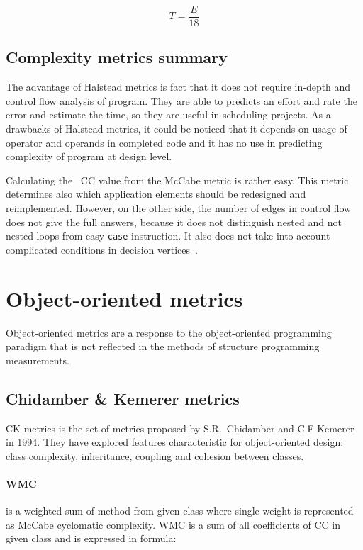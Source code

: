 \begin{equation}
T=\frac { E }{ 18 } 
\end{equation}

\subsection{Complexity metrics summary}
The advantage of Halstead metrics is fact that it does not require in-depth and control flow analysis of program. They are able to predicts an effort and rate the error and estimate the time, so they are useful in scheduling projects. As a drawbacks of Halstead metrics, it could be noticed that it depends on usage of operator and operands in completed code and it has no use in predicting complexity of program at design level.

Calculating the ~\ac{CC} value from the McCabe metric is rather easy. This metric determines also which application elements should be redesigned and reimplemented. However, on the other side, the number of edges in control flow does not give the full answers, because it does not distinguish nested and not nested loops from easy \texttt{case} instruction. It also does not take into account complicated conditions in decision vertices~\cite{complexity1}.


\section{Object-oriented metrics}
Object-oriented metrics are a response to the object-oriented programming paradigm that is not reflected in the methods of structure programming measurements.   

\subsection{Chidamber \& Kemerer metrics}
\ac{CK metrics} is the set of metrics proposed by S.R.~Chidamber and C.F Kemerer in 1994. They have explored features characteristic for object-oriented design: class complexity, inheritance, coupling and cohesion between classes.   
\paragraph{\ac{WMC}} is a weighted sum of method from given class where single weight is represented as McCabe cyclomatic complexity. \ac{WMC} is a sum of all coefficients of \ac{CC} in given class and is expressed in formula:

